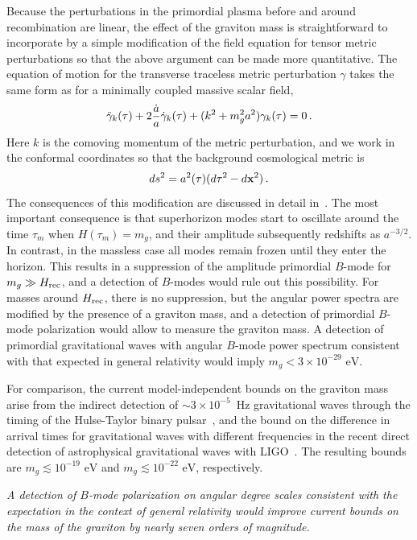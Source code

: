 Because the perturbations in the primordial plasma before and around recombination are linear, the effect of the graviton mass is straightforward to incorporate by a simple modification of the field equation for tensor metric perturbations so that the above argument can be made more quantitative. The equation of motion for the transverse traceless metric perturbation $\gamma$ takes the same form as for a minimally coupled massive scalar field,
\begin{equation}
\label{massive}
\ddot{\gamma}_k(\tau)+2{\dot a\over a} \dot{\gamma}_k(\tau)+(k^2+m_g^2 a^2) \gamma_k(\tau)=0\,.
\end{equation}
Here $k$ is the comoving momentum of the metric perturbation, and we work in the conformal coordinates so that the background cosmological metric is
\begin{equation}
ds^2= a^2(\tau)(d\tau^2-d{\bf x}^2)\,.
\end{equation}
The consequences of this modification are discussed in detail in~\cite{Dubovsky:2009xk}. The most important consequence is that superhorizon modes start to oscillate around the time $\tau_m$ when $H(\tau_m)=m_g$, and their amplitude subsequently redshifts as $a^{-3/2}$. In contrast, in the massless case all modes remain frozen until they enter the horizon. This results in a suppression of the amplitude primordial $B$-mode for $m_g\gg H_{\rm rec}$, and a detection of $B$-modes would rule out this possibility. For masses around $H_{\rm rec}$, there is no suppression, but the angular power spectra are modified by the presence of a graviton mass, and a detection of primordial $B$-mode polarization would allow to measure the graviton mass. A detection of primordial gravitational waves with angular $B$-mode power spectrum consistent with that expected in general relativity would imply $m_g< 3\times 10^{-29}{\mbox{ eV}}$.
 
For comparison, the current model-independent bounds on the graviton mass arise from the indirect detection of $\sim 3\times 10^{-5}$~Hz gravitational waves through the timing of the Hulse-Taylor binary pulsar~\cite{PhysRevD.65.044022}, and the bound on the difference in arrival times for gravitational waves with different frequencies in the recent direct detection of astrophysical gravitational waves with LIGO~\cite{PhysRevLett.116.061102}. The resulting bounds are $m_g\lesssim 10^{-19}{\mbox{ eV}}$ and $m_g\lesssim 10^{-22}{\mbox{ eV}}$, respectively. 

{\it A detection of $B$-mode polarization on angular degree scales consistent with the expectation in the context of general relativity would improve current bounds on the mass of the graviton by nearly seven orders of magnitude.} 

